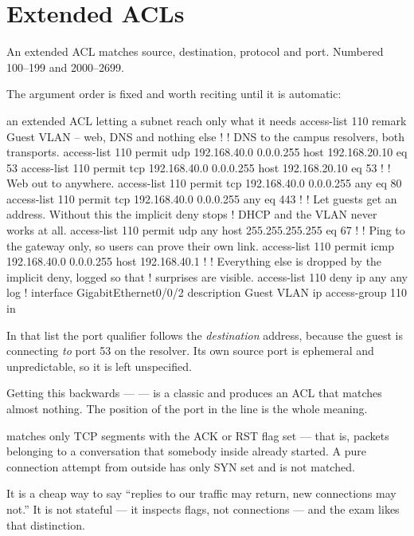 \section{Extended ACLs}

An extended ACL matches source, destination, protocol and port. Numbered 100--199
and 2000--2699.

The argument order is fixed and worth reciting until it is automatic:

\begin{center}
\end{center}

\begin{config}{an extended ACL letting a subnet reach only what it needs}
access-list 110 remark Guest VLAN -- web, DNS and nothing else
!
! DNS to the campus resolvers, both transports.
access-list 110 permit udp 192.168.40.0 0.0.0.255 host 192.168.20.10 eq 53
access-list 110 permit tcp 192.168.40.0 0.0.0.255 host 192.168.20.10 eq 53
!
! Web out to anywhere.
access-list 110 permit tcp 192.168.40.0 0.0.0.255 any eq 80
access-list 110 permit tcp 192.168.40.0 0.0.0.255 any eq 443
!
! Let guests get an address. Without this the implicit deny stops
! DHCP and the VLAN never works at all.
access-list 110 permit udp any host 255.255.255.255 eq 67
!
! Ping to the gateway only, so users can prove their own link.
access-list 110 permit icmp 192.168.40.0 0.0.0.255 host 192.168.40.1
!
! Everything else is dropped by the implicit deny, logged so that
! surprises are visible.
access-list 110 deny ip any any log
!
interface GigabitEthernet0/0/2
 description Guest VLAN
 ip access-group 110 in
\end{config}

\begin{conceptbox}
In that list the port qualifier follows the \emph{destination} address, because
the guest is connecting \emph{to} port 53 on the resolver. Its own source port is
ephemeral and unpredictable, so it is left unspecified.

Getting this backwards ---  ---
is a classic and produces an ACL that matches almost nothing. The position of the
port in the line is the whole meaning.
\end{conceptbox}

\begin{examnote}
 matches only TCP segments
with the ACK or RST flag set --- that is, packets belonging to a conversation
that somebody inside already started. A pure connection attempt from outside has
only SYN set and is not matched.

It is a cheap way to say ``replies to our traffic may return, new connections may
not.'' It is not stateful --- it inspects flags, not connections --- and the exam
likes that distinction.
\end{examnote}

